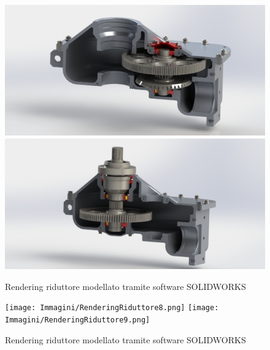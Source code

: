 \begin{figure}[h]
    \centering
    \includegraphics[scale=0.27]{Immagini/RenderingRiduttore6.png}
    \includegraphics[scale=0.27]{Immagini/RenderingRiduttore7.png}
    \caption{Rendering riduttore modellato tramite software SOLIDWORKS}
    \label{fig:riduttore34}
\end{figure}
\newpage
\begin{figure}[h]
    \centering
     \texttt{[image: Immagini/RenderingRiduttore8.png]}
     \texttt{[image: Immagini/RenderingRiduttore9.png]}
    \caption{Rendering riduttore modellato tramite software SOLIDWORKS}
    \label{fig:my_label}
\end{figure}
